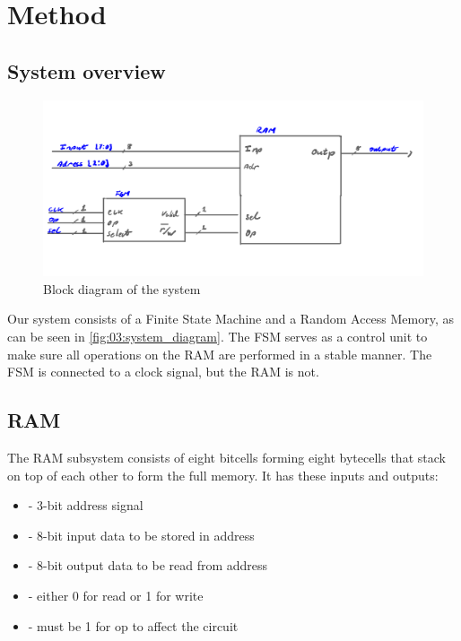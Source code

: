 \section{Method}    \label{sec:03:method}
\subsection{System overview}

\begin{figure}[hb]
    \centering
    \includegraphics[width=0.8\linewidth]{LaTeX_2/Figures/memory_block_schematic.png}
    \caption{Block diagram of the system}
    \label{fig:03:system_diagram}
\end{figure}

Our system consists of a Finite State Machine and a Random Access Memory, as can be seen in \autoref{fig:03:system_diagram}. The FSM serves as a control unit to make sure all operations on the RAM are performed in a stable manner. The FSM is connected to a clock signal, but the RAM is not.

\subsection{RAM}
The RAM subsystem consists of eight bitcells forming eight bytecells that stack on top of each other to form the full memory. It has these inputs and outputs:
\begin{itemize}
    \item {} - 3-bit address signal
    \item {} - 8-bit input data to be stored in address
    \item {} - 8-bit output data to be read from address
    \item {} - either 0 for read or 1 for write
    \item {} - must be 1 for op to affect the circuit
\end{itemize}

